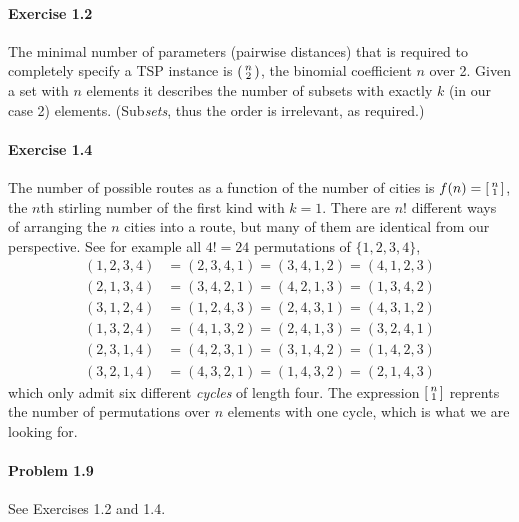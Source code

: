 \documentclass{article}
\begin{document}
\paragraph{Exercise 1.2} The minimal number of parameters (pairwise distances) that is required to completely specify a TSP instance is $\begin{psmallmatrix}
    n \\ 2
\end{psmallmatrix}$, the binomial coefficient $n$ over 2. Given a set with $n$ elements it describes the number of subsets with exactly $k$ (in our case 2) elements. (Sub\emph{sets}, thus the order is irrelevant, as required.)

\paragraph{Exercise 1.4} The number of possible routes as a function of the number of cities is $f(n) = \begin{bsmallmatrix}n \\ 1\end{bsmallmatrix}$, the $n$th stirling number of the first kind with $k = 1$. There are $n!$ different ways of arranging the $n$ cities into a route, but many of them are identical from our perspective. See for example all $4! = 24$ permutations of $\{1, 2, 3, 4\}$,
\begin{align*}
    (1, 2, 3, 4) &= (2, 3, 4, 1) = (3, 4, 1, 2) = (4, 1, 2, 3) \\
    (2, 1, 3, 4) &= (3, 4, 2, 1) = (4, 2, 1, 3) = (1, 3, 4, 2) \\
    (3, 1, 2, 4) &= (1, 2, 4, 3) = (2, 4, 3, 1) = (4, 3, 1, 2) \\
    (1, 3, 2, 4) &= (4, 1, 3, 2) = (2, 4, 1, 3) = (3, 2, 4, 1) \\
    (2, 3, 1, 4) &= (4, 2, 3, 1) = (3, 1, 4, 2) = (1, 4, 2, 3) \\
    (3, 2, 1, 4) &= (4, 3, 2, 1) = (1, 4, 3, 2) = (2, 1, 4, 3)
\end{align*}
which only admit six different \emph{cycles} of length four. The expression $\begin{bsmallmatrix}n \\ 1\end{bsmallmatrix}$ reprents the number of permutations over $n$ elements with one cycle, which is what we are looking for.  

\paragraph{Problem 1.9} See Exercises 1.2 and 1.4.
\end{document}
